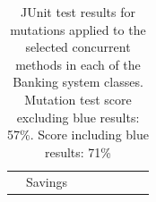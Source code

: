 \documentclass[a4paper,12pt]{article}
\begin{document}
\begin{table}[htp]
\begin{tabular}{lcllllll}
\multicolumn{1}{c|}{\textbf{}}                                                                                   & \multicolumn{1}{c|}{Savings}   & \multicolumn{1}{l|}{\cellcolor[HTML]{32CB00}} & \multicolumn{1}{l|}{\cellcolor[HTML]{FE0000}} & \multicolumn{1}{l|}{\cellcolor[HTML]{FFFFFF}} & \multicolumn{1}{l|}{\cellcolor[HTML]{32CB00}} & \multicolumn{1}{l|}{\cellcolor[HTML]{31A4FF}} & \multicolumn{1}{l|}{\cellcolor[HTML]{FFFFFF}} \\ \cline{2-8} 
\end{tabular}
\caption{JUnit test results for mutations applied to the selected concurrent methods in each of the Banking system classes. Mutation test score excluding blue results: 57\%. Score including blue results: 71\%}
\label{table:banking_junit_results}
\end{table}
\end{document}

